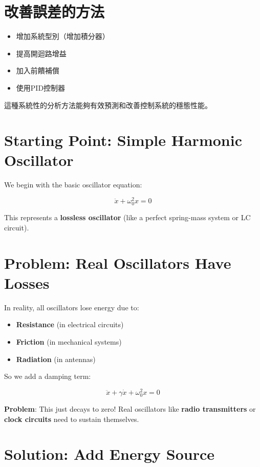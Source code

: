 \documentclass{article}
\begin{document}
\section{改善誤差的方法}

\begin{itemize}
    \item 增加系統型別（增加積分器）
    \item 提高開迴路增益
    \item 加入前饋補償
    \item 使用PID控制器
\end{itemize}

這種系統性的分析方法能夠有效預測和改善控制系統的穩態性能。


\section{Starting Point: Simple Harmonic Oscillator}

We begin with the basic oscillator equation:

\begin{equation}
\ddot{x} + \omega_0^2 x = 0
\end{equation}

This represents a \textbf{lossless oscillator} (like a perfect spring-mass system or LC circuit).

\section{Problem: Real Oscillators Have Losses}

In reality, all oscillators lose energy due to:
\begin{itemize}
    \item \textbf{Resistance} (in electrical circuits)
    \item \textbf{Friction} (in mechanical systems)
    \item \textbf{Radiation} (in antennas)
\end{itemize}

So we add a damping term:

\begin{equation}
\ddot{x} + \gamma\dot{x} + \omega_0^2 x = 0
\end{equation}

\textbf{Problem}: This just decays to zero! Real oscillators like \textbf{radio transmitters} or \textbf{clock circuits} need to sustain themselves.

\section{Solution: Add Energy Source}
\end{document}
